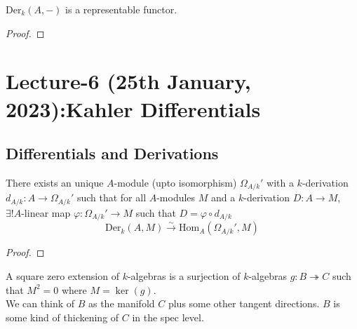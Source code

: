\documentclass[oneside, 12pt, ]{scrbook}
\newcommand{\Hom}{\mathrm{Hom}}
\theoremstyle{theorem}
\begin{document}
\begin{proposition}
$\mathrm{Der}_{k}(A,-)$ is a representable functor.
\end{proposition}

\begin{proof}

\end{proof}

\chapter{Lecture-6 (25th January, 2023):Kahler Differentials}

\section{Differentials and Derivations}

\begin{theorem}
There exists an unique $A$-module (upto isomorphism) $\Omega_{A/k}'$ with a $k$-derivation $d_{A/k}: A \rightarrow \Omega_{A/k}'$ such that for all $A$-modules $M$ and a $k$-derivation $D: A \rightarrow M$, $\exists ! A$-linear map $\varphi : \Omega_{A/k}' \rightarrow M$ such that $D = \varphi \circ d_{A/k}$ $$\mathrm{Der}_{k}(A,M) \xrightarrow{\sim} \Hom_{A}(\Omega_{A/k}' , M)$$
\end{theorem}

\begin{proof}

\end{proof}

\begin{definition}
A square zero extension of $k$-algebras is a surjection of $k$-algebras $g: B \twoheadrightarrow C$ such that $M^2 = 0$ where $M = \ker(g)$. \\
We can think of $B$ as the manifold $C$ plus some other tangent directions. $B$ is some kind of thickening of $C$ in the spec level.
\end{definition}
\end{document}
